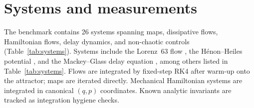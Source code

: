 \documentclass[aip,cha,preprint,amsmath,amssymb,floatfix]{revtex4-2}
\begin{document}
\section{Systems and measurements}

The benchmark contains 26 systems spanning maps, dissipative flows, Hamiltonian
flows, delay dynamics, and non-chaotic controls (Table~\ref{tab:systems}). Systems
include the Lorenz~63 flow \cite{lorenz1963}, the H\'{e}non--Heiles potential
\cite{henon1964}, and the Mackey--Glass delay equation \cite{mackey1977}, among
others listed in Table~\ref{tab:systems}. Flows are integrated by fixed-step RK4
after warm-up onto the attractor; maps are iterated directly. Mechanical Hamiltonian
systems are integrated in canonical $(q,p)$ coordinates. Known analytic invariants
are tracked as integration hygiene checks.
\end{document}
